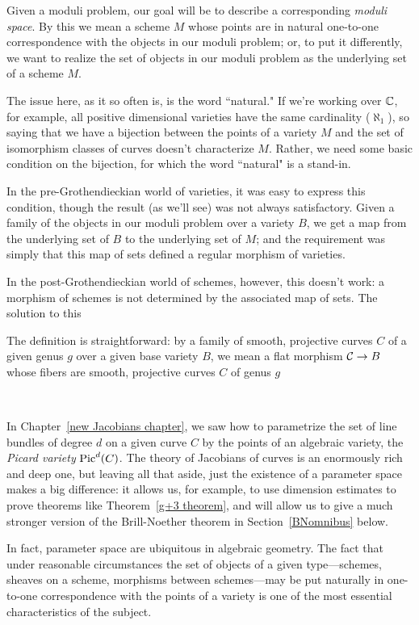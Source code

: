Given a moduli problem, our goal will be to describe a corresponding \emph{moduli space}. By this we mean a scheme $M$ whose points are in natural one-to-one correspondence with the objects in our moduli problem; or, to put it differently, we want to realize the set of objects in our moduli problem as the underlying set of a scheme $M$.

The issue here, as it so often is,  is the word ``natural." If we're working over $\CC$, for example, all positive dimensional varieties have the same cardinality ($\aleph_1$), so saying that we have a bijection between the points of a variety $M$ and the set of isomorphism classes of curves doesn't characterize $M$. Rather, we need some basic condition on the bijection, for which the word ``natural" is a stand-in. 

In the pre-Grothendieckian world of varieties, it was easy to express this condition, though the result (as we'll see) was not always satisfactory. Given a family of the objects in our moduli problem over a variety $B$, we get a map from the underlying set of $B$ to the underlying set of $M$; and the requirement was simply that this map of sets defined a regular morphism of varieties.

In the post-Grothendieckian world of schemes, however, this doesn't work: a morphism of schemes is not determined by the associated map of sets. The solution to this 

The definition is straightforward: by a family of smooth, projective curves $C$ of a given genus $g$ over a given base variety $B$, we mean a flat morphism
$\cC \to B$ whose fibers are smooth, projective curves $C$ of genus $g$

\

In Chapter~\ref{new Jacobians chapter}, we saw how to parametrize the set of line bundles of degree $d$ on a given curve $C$ by the points of an algebraic variety, the \emph{Picard variety} $\Pic^d(C)$. The theory of  Jacobians of curves is an enormously rich and deep one, but leaving all that aside, just the existence of a parameter space makes a big difference: it allows us, for example, to use dimension estimates to prove theorems like Theorem~\ref{g+3 theorem}, and will allow us to give a much stronger version of the Brill-Noether theorem in Section~\ref{BNomnibus} below.

In fact, parameter space are ubiquitous in algebraic geometry. The fact that under reasonable circumstances the set of objects of a given type---schemes, sheaves on a scheme, morphisms between schemes---may be put naturally in one-to-one correspondence with the points of a variety is one of the most essential characteristics of the subject.

